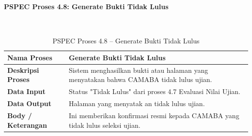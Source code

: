 \paragraph{PSPEC Proses 4.8: Generate Bukti Tidak Lulus}~\\
\begin{longtable}{|p{}|p{}|}
	\caption{PSPEC Proses 4.8 -- Generate Bukti Tidak Lulus}
	\label{table:3.pspec48}\\
	\hline
	\textbf{Nama Proses} & Generate Bukti Tidak Lulus \\
	\hline
	\textbf{Deskripsi Proses} & Sistem menghasilkan bukti atau halaman yang menyatakan bahwa CAMABA tidak lulus ujian. \\
	\hline
	\textbf{Data Input} & Status "Tidak Lulus" dari proses 4.7 Evaluasi Nilai Ujian. \\
	\hline
	\textbf{Data Output} & Halaman yang menyatak an tidak lulus ujian. \\
	\hline
	\textbf{Body / Keterangan} & Ini memberikan konfirmasi resmi kepada CAMABA yang tidak lulus seleksi ujian. \\
	\hline
\end{longtable}


